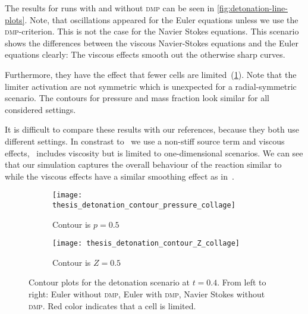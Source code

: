 The results for runs with and without \textsc{dmp} can be seen in \cref{fig:detonation-line-plots}.
Note, that oscillations appeared for the Euler equations unless we use the \textsc{dmp}-criterion.
This is not the case for the Navier Stokes equations.
This scenario shows the differences between the viscous Navier-Stokes equations and the Euler equations clearly:
The viscous effects smooth out the otherwise sharp curves.

Furthermore, they have the effect that fewer cells are limited~(\cref{fig:detonation-pressure-contour}).
Note that the limiter activation are not symmetric which is unexpected for a radial-symmetric scenario.
The contours for pressure and mass fraction look similar for all considered settings.

It is difficult to compare these results with our references, because they both use different settings.
In constrast to~\cite{helzel2000modified} we use a non-stiff source term and viscous effects,~\cite{hidalgo2011ader} includes viscosity but is limited to one-dimensional scenarios.
We can see that our simulation captures the overall behaviour of the reaction similar to~\cite{helzel2000modified} while the viscous effects have a similar smoothing effect as in~\cite{hidalgo2011ader}.

\begin{figure}[htb]
  \centering
  \begin{subfigure}[t]{1.0\textwidth}
    \centering
  \texttt{[image: thesis\_detonation\_contour\_pressure\_collage]} 
  \caption{Contour is $p = 0.5$}
  \end{subfigure}
  \begin{subfigure}[t]{1.0\textwidth}
    \centering
  \texttt{[image: thesis\_detonation\_contour\_Z\_collage]} 
  \caption{Contour is $Z = 0.5$}
  \end{subfigure}
  \caption{\label{fig:detonation-pressure-contour}%
    Contour plots for the detonation scenario at $t=0.4$.
    From left to right: Euler without \textsc{dmp}, Euler with \textsc{dmp}, Navier Stokes without \textsc{dmp}.
    Red color indicates that a cell is limited.
  }
\end{figure}

